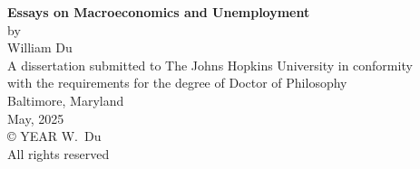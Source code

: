 \thispagestyle{empty}
\baselineskip=18pt
\begin{center}
\vspace*{3\baselineskip}
%
{\bfseries Essays on Macroeconomics and Unemployment}\\[6\baselineskip]
%
by\\
%
William Du\\[3\baselineskip]
%
%
A dissertation submitted to The Johns Hopkins University in conformity\\
with the requirements for the degree of Doctor of Philosophy\\[4\baselineskip]
%
Baltimore, Maryland\\
May, 2025\\[6\baselineskip]
%
{\copyright{} YEAR W.~Du\\
All rights reserved}
%
\end{center}
%
\baselineskip=24pt
\newpage 
